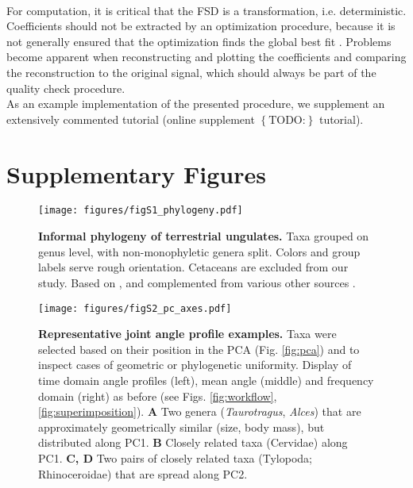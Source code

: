 \documentclass[10pt, a4paper]{article}
\newcommand{\todo}[1]{\colorbox{terracotta!30!yellow}{\footnotesize{$\left\lbrace\text{TODO:}\right\rbrace$ }#1\normalsize}}
\begin{document}
\bigskip\\For computation, it is critical that the FSD is a transformation, i.e. deterministic. 
Coefficients should not be extracted by an optimization procedure, because it is not generally ensured that the optimization finds the global best fit \citep{Hubel2015,Basu2019}. 
Problems become apparent when reconstructing and plotting the coefficients and comparing the reconstruction to the original signal, which should always be part of the quality check procedure. 
\\ As an example implementation of the presented procedure, we supplement an extensively commented tutorial (online supplement \todo{tutorial}). 


\FloatBarrier
\pagebreak
\section{Supplementary Figures}

\begin{figure}[pt]
\texttt{[image: figures/figS1\_phylogeny.pdf]}
\caption[Phylogeny]{\textbf{Informal phylogeny of terrestrial ungulates.} Taxa grouped on genus level, with non-monophyletic genera split. Colors and group labels serve rough orientation. Cetaceans are excluded from our study. 
Based on \citet{Zurano2019}, and complemented from various other sources \citep{ParisiDutra2017,Frantz2015,Ryder2011,Price2009,Gongora2011,Funk2007,Hassanin2012}.
 }
\label{fig:phylogeny}
\end{figure}

\begin{figure}[pt]
\texttt{[image: figures/figS2\_pc\_axes.pdf]}
\caption[Representative Examples]{\textbf{Representative joint angle profile examples.} 
Taxa were selected based on their position in the PCA (Fig. \ref{fig:pca}) and to inspect cases of geometric or phylogenetic uniformity. 
Display of time domain angle profiles (left), mean angle (middle) and frequency domain (right) as before (see Figs. \ref{fig:workflow}, \ref{fig:superimposition}). 
\textbf{A} Two genera (\textit{Taurotragus}, \textit{Alces}) that are approximately geometrically similar (size, body mass), but distributed along PC1. %
\textbf{B} Closely related taxa (Cervidae) along PC1. 
\textbf{C, D} Two pairs of closely related taxa (Tylopoda; Rhinoceroidae) that are spread along PC2.  
 }
\label{fig:examples}
\end{figure}
\end{document}
